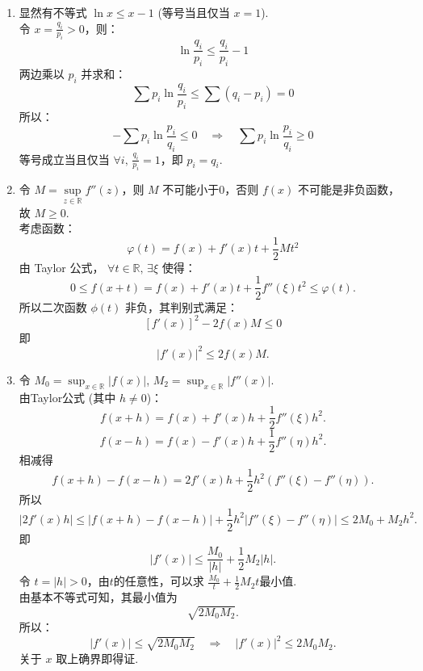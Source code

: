 \begin{solution}
    \begin{enumerate}
    \item[1.]
    显然有不等式 $\displaystyle \ln x \leq x - 1 $ (等号当且仅当 $ x = 1 $).\\
    令 $\displaystyle x = \frac{q_i}{p_i}>0 $，则：
    \[
    \ln \frac{q_i}{p_i} \leq \frac{q_i}{p_i} - 1
    \]
    两边乘以 $ p_i $ 并求和：
    \[
    \sum p_i \ln \frac{q_i}{p_i} \leq \sum (q_i - p_i) = 0
    \]
    所以：
    \[
    - \sum p_i \ln \frac{p_i}{q_i} \leq 0 \quad \Rightarrow \quad \sum p_i \ln \frac{p_i}{q_i} \geq 0
    \]
    等号成立当且仅当 $\displaystyle \forall i,\, \frac{q_i}{p_i} = 1 $，即 $ p_i = q_i $. 

    \item[2.]
    令 $\displaystyle M = \underset{z\in\mathbb{R}}{\sup} f''(z) $，则 $M$ 不可能小于0，否则 $f(x)$ 不可能是非负函数，故 $ M \geq 0 $.\\
    考虑函数：
    \[
    \varphi(t) = f(x) + f'(x) t + \frac{1}{2} M t^2
    \]
    由 Taylor 公式， $\forall t\in\mathbb{R} ,\, \exists \xi $ 使得：
    \[
    0\leq f(x+t) = f(x) + f'(x) t + \frac{1}{2} f''(\xi) t^2 \leq \varphi(t).
    \]
    所以二次函数 $ \phi(t) $ 非负，其判别式满足：
    \[
    [f'(x)]^2 - 2 f(x) M \leq 0
    \]
    即
    \[
    |f'(x)|^2 \leq 2 f(x) M. 
    \]

    \item[3.]
    令 $\displaystyle M_0 = \sup_{x\in\mathbb{R}} |f(x)| $, $ M_2 = \sup_{x\in\mathbb{R}} |f''(x)| $.\\
    由Taylor公式 (其中 $h\neq 0$)：
    \[
    f(x+h) = f(x) + f'(x) h + \frac{1}{2} f''(\xi) h^2.
    \]
    \[
    f(x-h) = f(x) - f'(x) h + \frac{1}{2} f''(\eta) h^2.
    \]
    相减得
    \[
    f(x+h) - f(x-h) = 2 f'(x) h + \frac{1}{2} h^2 (f''(\xi) - f''(\eta)).
    \]
    所以
    \[
    |2 f'(x) h| \leq |f(x+h) - f(x-h)| + \frac{1}{2} h^2 |f''(\xi) - f''(\eta)| \leq 2 M_0 + M_2 h^2.
    \]
    即
    \[
    |f'(x)| \leq \frac{M_0}{|h|} + \frac{1}{2} M_2 |h|.
    \]
    令 $ t = |h| > 0 $，由$t$的任意性，可以求 $\displaystyle \frac{M_0}{t} + \frac{1}{2} M_2 t $最小值.\\
    由基本不等式可知，其最小值为
    \[
    \sqrt{2 M_0 M_2}.
    \]
    所以：
    \[
    |f'(x)| \leq \sqrt{2 M_0 M_2} \quad \Rightarrow \quad |f'(x)|^2 \leq 2 M_0 M_2.
    \]
    关于 $x$ 取上确界即得证.
    \end{enumerate}
\end{solution}